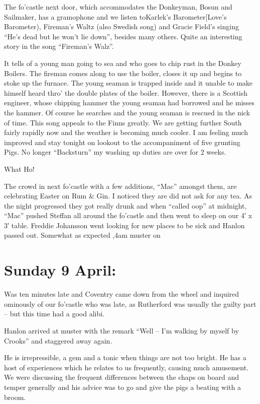 \documentclass[
  11pt,
  msmallroyalvopaper
]{memoir}
\begin{document}
The fo'castle next door, which accommodates the Donkeyman, Bosun and
Sailmaker, has a gramophone and we listen toKarlek's Barometer{[}Love's
Barometer), Fireman's Waltz (also Swedish song) and Gracie Field's
singing ``He's dead but he won't lie down'', besides many others. Quite
an interesting story in the song ``Fireman's Walz''.

It tells of a young man going to sea and who goes to chip rust in the
Donkey Boilers. The fireman comes along to use the boiler, closes it up
and begins to stoke up the furnace. The young seaman is trapped inside
and it unable to make himself heard thro' the double plates of the
boiler. However, there is a Scottish engineer, whose chipping hammer the
young seaman had borrowed and he misses the hammer. Of course he
searches and the young seaman is rescued in the nick of time. This song
appeals to the Finns greatly. We are getting further South fairly
rapidly now and the weather is becoming much cooler. I am feeling much
improved and stay tonight on lookout to the accompaniment of five
grunting Pigs. No longer ``Backsturn'' my washing up duties are over for
2 weeks.

What Ho!

The crowd in next fo'castle with a few additions, ``Mac'' amongst them,
are celebrating Easter on Rum \& Gin. I noticed they are did not ask for
any tea. As the night progressed they got really drunk and when ``called
oop'' at midnight, ``Mac'' pushed Steffan all around the fo'castle and
then went to sleep on our 4′ x 3′ table. Freddie Johansson went looking
for new places to be sick and Hanlon passed out. Somewhat as expected
,4am muster on

\hypertarget{sunday-9-april}{%
\section{Sunday 9 April:}\label{sunday-9-april}}

Was ten minutes late and Coventry came down from the wheel and inquired
ominously of our fo'castle who was late, as Rutherford was usually the
guilty part -- but this time had a good alibi.

Hanlon arrived at muster with the remark ``Well -- I'm walking by myself
by Crooks'' and staggered away again.

He is irrepressible, a gem and a tonic when things are not too bright.
He has a host of experiences which he relates to us frequently, causing
much amusement. We were discussing the frequent differences between the
chaps on board and temper generally and his advice was to go and give
the pigs a beating with a broom.
\end{document}

